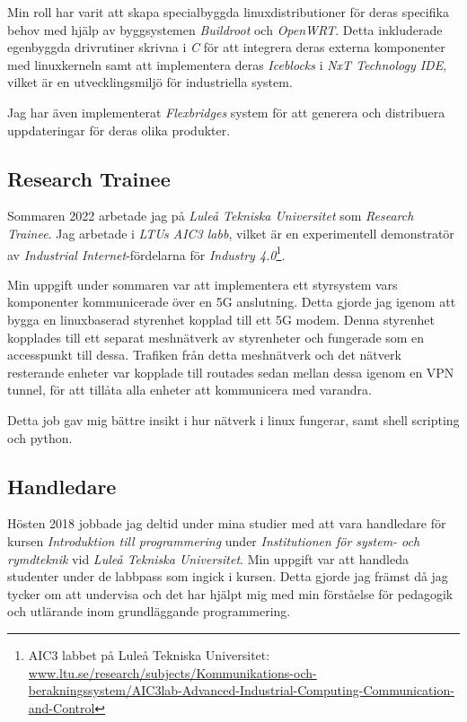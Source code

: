 \documentclass{article}
\begin{document}
Min roll har varit att skapa specialbyggda linuxdistributioner för deras specifika behov med hjälp av byggsystemen 
\textit{Buildroot} och \textit{OpenWRT}. 
Detta inkluderade egenbyggda drivrutiner skrivna i \textit{C} för att integrera deras externa komponenter med linuxkerneln samt att 
implementera deras \textit{Iceblocks} i \textit{NxT Technology IDE}, vilket är en utvecklingsmiljö för industriella system.

Jag har även implementerat \textit{Flexbridges} system för att generera och distribuera uppdateringar för deras olika produkter.


\subsection{Research Trainee}
Sommaren 2022 arbetade jag på \textit{Luleå Tekniska Universitet} som \textit{Research Trainee}. Jag arbetade i \textit{LTUs AIC3 labb}, 
vilket är en experimentell demonstratör av \textit{Industrial Internet}-fördelarna för \textit{Industry 4.0}\footnote{AIC3 labbet på 
Luleå Tekniska Universitet: 
\url{www.ltu.se/research/subjects/Kommunikations-och-berakningssystem/AIC3lab-Advanced-Industrial-Computing-Communication-and-Control}}.

Min uppgift under sommaren var att implementera ett styrsystem vars komponenter kommunicerade över en 5G anslutning. 
Detta gjorde jag igenom att bygga en linuxbaserad styrenhet kopplad till ett 5G modem. Denna styrenhet kopplades till ett separat meshnätverk
av styrenheter och fungerade som en accesspunkt till dessa.
Trafiken från detta meshnätverk och det nätverk resterande enheter var kopplade till routades sedan mellan dessa igenom en VPN tunnel, för att 
tillåta alla enheter att kommunicera med varandra.

Detta job gav mig bättre insikt i hur nätverk i linux fungerar, samt shell scripting och python.


\subsection{Handledare}
Hösten 2018 jobbade jag deltid under mina studier med att vara handledare för kursen \textit{Introduktion till programmering} under
\textit{Institutionen för system- och rymdteknik} vid \textit{Luleå Tekniska Universitet}. Min uppgift var att handleda studenter under de labbpass
som ingick i kursen. Detta gjorde jag främst då jag tycker om att undervisa och det har hjälpt mig med min förståelse för pedagogik och utlärande 
inom grundläggande programmering.
\end{document}
